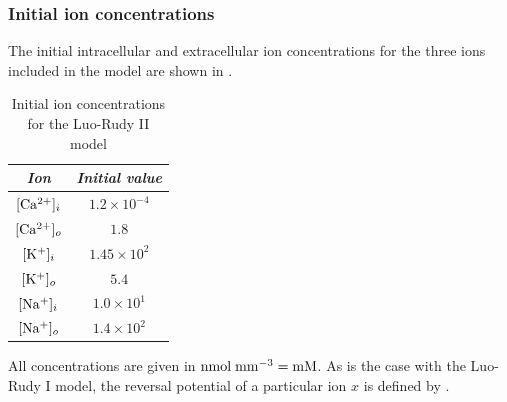 \subsubsection{Initial ion concentrations}
The initial intracellular and extracellular ion concentrations for the three
ions included in the model are shown in .
\begin{table}[hbtp] \centering
  \begin{tabular}{|c|c|}
    \hline
    \emph{Ion} & \emph{Initial value} \\ 
    \hline
    \hline 
      $ [\mathrm{Ca^{2+}}]_{i} $ & $1.2 \times 10^{-4}$ \\
      $ [\mathrm{Ca^{2+}}]_{o} $ & $1.8$ \\
      $ [\mathrm{K^{+}}]_{i} $ & $1.45 \times 10^{2}$ \\
      $ [\mathrm{K^{+}}]_{o} $ & $5.4$ \\
      $ [\mathrm{Na^{+}}]_{i} $ & $1.0 \times 10^{1}$ \\
      $ [\mathrm{Na^{+}}]_{o} $ & $1.4 \times 10^{2}$ \\
    \hline
  \end{tabular}
  \caption[Initial ion concentrations for the Luo-Rudy II model]{Initial ion
    concentrations for the Luo-Rudy II model}
  \label{tab:lr2_init_ions}
\end{table}
All concentrations are given in $\mathrm{nmol}\thickspace\mathrm{mm}^{-3}=\mathrm{mM}$.
As is the case with the Luo-Rudy I model, the reversal potential of
a particular ion $x$ is defined by .
%
